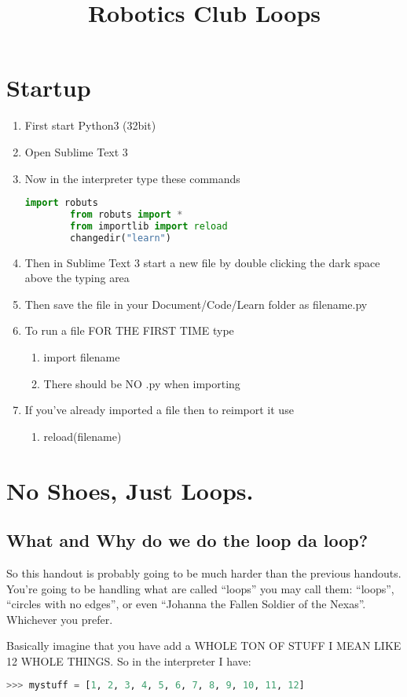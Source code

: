 \documentclass{article}
\title{Robotics Club Loops}
\begin{document}
\section{Startup}
\begin{enumerate}
	\item First start Python3 (32bit)
    \item Open Sublime Text 3
    \item Now in the interpreter type these commands
    \begin{lstlisting}[language=Python]
    	import robuts
        from robuts import *
        from importlib import reload
        changedir("learn")
   \end{lstlisting}

   \item Then in Sublime Text 3 start a new file by double clicking the dark space above the typing area
   \item Then save the file in your Document/Code/Learn folder as filename.py
   \item To run a file FOR THE FIRST TIME type
  \begin{enumerate}
      \item import filename
      \item There should be NO .py when importing
   \end{enumerate}
   \item If you've already imported a file then to reimport it use
   \begin{enumerate}
		\item reload(filename)
   \end{enumerate}
\end{enumerate}	

\section{No Shoes, Just Loops.}

\subsection{What and Why do we do the loop da loop?}

So this handout is probably going to be much harder than the previous handouts. 
You're going to be handling what are called ``loops'' you may call them: ``loops'', ``circles with no 
edges'', or even ``Johanna the Fallen Soldier of the Nexas''. 
Whichever you prefer. 

Basically imagine that you have add a WHOLE TON OF STUFF I MEAN LIKE 12 WHOLE THINGS. 
So in the interpreter I have:
\begin{lstlisting}[language=Python]
>>> mystuff = [1, 2, 3, 4, 5, 6, 7, 8, 9, 10, 11, 12]
\end{lstlisting}
\end{document}
